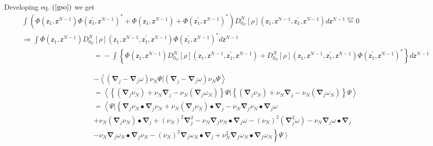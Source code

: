 \documentclass[aps,preprint]{revtex4}%
\begin{document}
Developing eq. $\left(  \ref{gso}\right)  $ we get
\begin{align}
&
{\displaystyle\int}
\left(  \Phi\left(  \mathsf{z}_{1},\mathsf{z}^{N-1}\right)  \Phi\left(
\mathsf{z}_{1}^{\prime},\mathsf{z}^{N-1}\right)  ^{\ast}+\Phi\left(
\mathsf{z}_{1},\mathsf{z}^{N-1}\right)  +\Phi\left(  \mathsf{z}_{1}^{\prime
},\mathsf{z}^{N-1}\right)  ^{\ast}\right)  D_{0_{F}}^{N}\left[  \rho\right]
\left(  \mathsf{z}_{1},\mathsf{z}^{N-1},\mathsf{z}_{1}^{\prime},\mathsf{z}%
^{N-1}\right)  d\mathsf{z}^{N-1}\overset{a.e}{=}0\nonumber\\
&  \Rightarrow\int\Phi\left(  \mathsf{z}_{1},\mathsf{z}^{N-1}\right)
D_{0_{F}}^{N}\left[  \rho\right]  \left(  \mathsf{z}_{1},\mathsf{z}%
^{N-1},\mathsf{z}_{1}^{\prime},\mathsf{z}^{N-1}\right)  \Phi\left(
\mathsf{z}_{1}^{\prime},\mathsf{z}^{N-1}\right)  ^{\ast}d\mathsf{z}%
^{N-1}\nonumber\\
&  \qquad\qquad\qquad\qquad\qquad\left.  =\right.  -\int\left\{  \Phi\left(
\mathsf{z}_{1},\mathsf{z}^{N-1}\right)  D_{0_{F}}^{N}\left[  \rho\right]
\left(  \mathsf{z}_{1},\mathsf{z}^{N-1},\mathsf{z}_{1}^{\prime},\mathsf{z}%
^{N-1}\right)  +D_{0_{F}}^{N}\left[  \rho\right]  \left(  \mathsf{z}%
_{1},\mathsf{z}^{N-1},\mathsf{z}_{1}^{\prime},\mathsf{z}^{N-1}\right)
\Phi\left(  \mathsf{z}_{1}^{\prime},\mathsf{z}^{N-1}\right)  ^{\ast}\right\}
d\mathsf{z}^{N-1}%
\end{align}


\bigskip%

\begin{align*}
&  -\left\langle \left(  \mathbf{\nabla}_{j}-\mathbf{\nabla}_{j}\omega\right)
\nu_{N}\Psi|\left(  \mathbf{\nabla}_{j}-\mathbf{\nabla}_{j}\omega\right)
\nu_{N}\Psi\right\rangle \\
&  =\left\langle \left\{  \left(  \mathbf{\nabla}_{j}\nu_{N}\right)  +\nu
_{N}\mathbf{\nabla}_{j}-\nu_{N}\left(  \mathbf{\nabla}_{j}\omega_{N}\right)
\right\}  \Psi|\left\{  \left(  \mathbf{\nabla}_{j}\nu_{N}\right)  +\nu
_{N}\mathbf{\nabla}_{j}-\nu_{N}\left(  \mathbf{\nabla}_{j}\omega_{N}\right)
\right\}  \Psi\right\rangle \\
&  =\left\langle \Psi|\left\{  \mathbf{\nabla}_{j}\nu_{N}\bullet
\mathbf{\nabla}_{j}\nu_{N}+\nu_{N}\left(  \mathbf{\nabla}_{j}\nu_{N}\right)
\bullet\mathbf{\nabla}_{j}-\nu_{N}\mathbf{\nabla}_{j}\nu_{N}\bullet
\mathbf{\nabla}_{j}\omega\right.  \right.  \\
&  +\nu_{N}\left(  \mathbf{\nabla}_{j}\nu_{N}\right)  \bullet\mathbf{\nabla
}_{j}+\left(  \nu_{N}\right)  ^{2}\mathbf{\nabla}_{j}^{2}-\nu_{N}%
\mathbf{\nabla}_{j}\nu_{N}\bullet\mathbf{\nabla}_{j}\omega-\left(  \nu
_{N}\right)  ^{2}\left(  \mathbf{\nabla}_{j}^{2}\omega\right)  -\nu
_{N}\mathbf{\nabla}_{j}\omega\bullet\mathbf{\nabla}_{j}\\
&  \left.  -\nu_{N}\mathbf{\nabla}_{j}\omega_{N}\bullet\mathbf{\nabla}_{j}%
\nu_{N}-\left(  \nu_{N}\right)  ^{2}\mathbf{\nabla}_{j}\omega_{N}%
\bullet\mathbf{\nabla}_{j}+\nu_{N}^{2}\mathbf{\nabla}_{j}\omega_{N}%
\bullet\mathbf{\nabla}_{j}\omega_{N}\right\}  \left.  \Psi\right\rangle
\end{align*}
\end{document}
